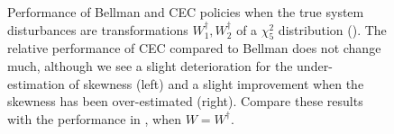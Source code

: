 \documentclass[main.tex]{subfiles}
\begin{document}
\begin{figure}[htbp]
\begin{subfigure}[b]{0.5\textwidth}
  \end{subfigure}
  \caption{Performance of Bellman and CEC policies when the true system disturbances
    are transformations $W_1^\dagger,W_2^\dagger$ of
    a $\chi_5^2$ distribution ().
    The relative performance of CEC compared to Bellman does not
    change much,
    although we see a slight deterioration for the under-estimation of
    skewness (left) and a slight improvement when the skewness has
    been over-estimated (right).
    Compare these results with the performance in
    , when $W=W^\dagger$.
  }\label{fig:markdown_bellman_mpc_chi2}
\end{figure}


\biblio
\end{document}
